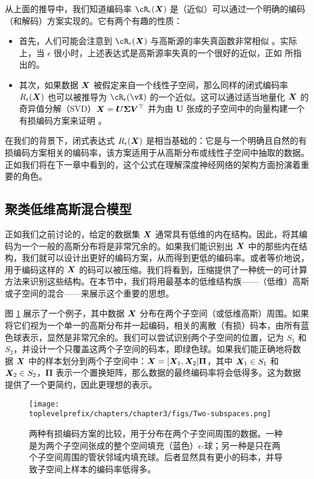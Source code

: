 \documentclass[../../book-main_zh.tex]{subfiles}
\begin{document}
从上面的推导中，我们知道编码率 $\cR_{\epsilon}(\X)$ 是（近似）可以通过一个明确的编码（和解码）方案实现的。它有两个有趣的性质：
\begin{itemize}
	\item 首先，人们可能会注意到 $\cR_{\epsilon}(\X)$ 与高斯源的率失真函数非常相似 \cite{Cover-Thomas}。实际上，当 $\epsilon$ 很小时，上述表达式是高斯源率失真的一个很好的近似，正如 \cite{MaY2007-PAMI} 所指出的。
	\item 其次，如果数据 $\bm{X}$ 被假定来自一个线性子空间，那么同样的闭式编码率 $R_{\epsilon}(\bm{X})$ 也可以被推导为 \(\cR_{\epsilon}(\vX)\) 的一个近似。这可以通过适当地量化 $\bm{X}$ 的奇异值分解（SVD）$\bm{X} = \boldsymbol{U} \boldsymbol{\Sigma}\boldsymbol{V}^\top$ 并为由 $\boldsymbol{U}$ 张成的子空间中的向量构建一个有损编码方案来证明 \cite{MaY2007-PAMI}。
\end{itemize}
在我们的背景下，闭式表达式 $R_{\epsilon}(\bm{X})$ 是相当基础的：它是与一个明确且自然的有损编码方案相关的编码率，该方案适用于从高斯分布或线性子空间中抽取的数据。正如我们将在下一章中看到的，这个公式在理解深度神经网络的架构方面扮演着重要的角色。


\subsection{聚类低维高斯混合模型}
\label{sec:clustering-Gaussians}
正如我们之前讨论的，给定的数据集 $\bm{X}$ 通常具有低维的内在结构。因此，将其编码为一个一般的高斯分布将是非常冗余的。如果我们能识别出 $\bm{X}$ 中的那些内在结构，我们就可以设计出更好的编码方案，从而得到更低的编码率。或者等价地说，用于编码这样的 $\bm{X}$ 的码可以被压缩。我们将看到，压缩提供了一种统一的可计算方法来识别这些结构。在本节中，我们将用最基本的低维结构族——（低维）高斯或子空间的混合——来展示这个重要的思想。

\begin{example}
	图 \ref{fig:two-subspaces} 展示了一个例子，其中数据 $\bm{X}$ 分布在两个子空间（或低维高斯）周围。如果将它们视为一个单一的高斯分布并一起编码，相关的离散（有损）码本，由所有蓝色球表示，显然是非常冗余的。我们可以尝试识别两个子空间的位置，记为 $S_1$ 和 $S_2$，并设计一个只覆盖这两个子空间的码本，即绿色球。如果我们能正确地将数据 $\bm{X}$ 中的样本划分到两个子空间中：$\bm{X} = [\bm{X}_1, \bm{X}_2]\bm \Pi$，其中 $\bm{X}_1 \in S_1$ 和 $\bm{X}_2 \in S_2$，$\bm \Pi$ 表示一个置换矩阵，那么数据的最终编码率将会低得多。这为数据提供了一个更简约，因此更理想的表示。
\end{example}

\begin{figure}
	\centering
	\texttt{[image: \\toplevelprefix/chapters/chapter3/figs/Two-subspaces.png]}
	\caption{两种有损编码方案的比较，用于分布在两个子空间周围的数据。一种是为两个子空间张成的整个空间填充（蓝色）$\epsilon$-球；另一种是只在两个子空间周围的管状邻域内填充球。后者显然具有更小的码本，并导致子空间上样本的编码率低得多。}
	\label{fig:two-subspaces}
\end{figure}
\end{document}

